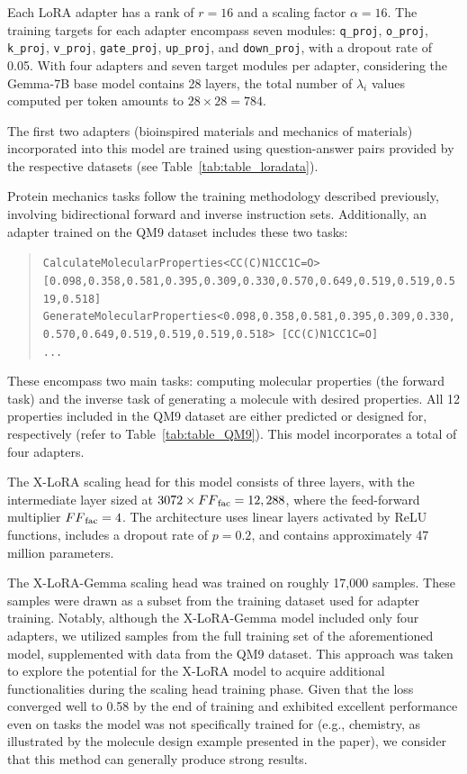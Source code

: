 Each LoRA adapter has a rank of $r=16$ and a scaling factor $\alpha=16$. The training targets for each adapter encompass seven modules: \texttt{q\_proj}, \texttt{o\_proj}, \texttt{k\_proj}, \texttt{v\_proj}, \texttt{gate\_proj}, \texttt{up\_proj}, and \texttt{down\_proj}, with a dropout rate of 0.05. With four adapters and seven target modules per adapter, considering the Gemma-7B base model contains 28 layers, the total number of $\lambda_i$ values computed per token amounts to $28 \times 28 = 784$.

The first two adapters (bioinspired materials and mechanics of materials) incorporated into this model are trained using question-answer pairs provided by the respective datasets (see Table~\ref{tab:table_loradata}).

Protein mechanics tasks follow the training methodology described previously, involving bidirectional forward and inverse instruction sets. Additionally, an adapter trained on the QM9 dataset includes these two tasks:

\begin{quote}
\tiny {\texttt{CalculateMolecularProperties<CC(C)N1CC1C=O> [0.098,0.358,0.581,0.395,0.309,0.330,0.570,0.649,0.519,0.519,0.519,0.518]\\
GenerateMolecularProperties<0.098,0.358,0.581,0.395,0.309,0.330,0.570,0.649,0.519,0.519,0.519,0.518> [CC(C)N1CC1C=O]\\ 
...
}}
\end{quote}

These encompass two main tasks: computing molecular properties (the forward task) and the inverse task of generating a molecule with desired properties. All 12 properties included in the QM9 dataset are either predicted or designed for, respectively (refer to Table~\ref{tab:table_QM9}).  
This model incorporates a total of four adapters.  

The X-LoRA scaling head for this model consists of three layers, with the intermediate layer sized at $3072 \times {FF}_{\rm fac} = 12,288$, where the feed-forward multiplier ${FF}_{\rm fac} = 4$. The architecture uses linear layers activated by ReLU functions, includes a dropout rate of $p=0.2$, and contains approximately 47 million parameters.  

The X-LoRA-Gemma scaling head was trained on roughly 17,000 samples. These samples were drawn as a subset from the training dataset used for adapter training. Notably, although the X-LoRA-Gemma model included only four adapters, we utilized samples from the full training set of the aforementioned model, supplemented with data from the QM9 dataset. This approach was taken to explore the potential for the X-LoRA model to acquire additional functionalities during the scaling head training phase. Given that the loss converged well to 0.58 by the end of training and exhibited excellent performance even on tasks the model was not specifically trained for (e.g., chemistry, as illustrated by the molecule design example presented in the paper), we consider that this method can generally produce strong results.

